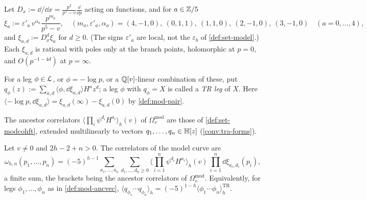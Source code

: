 \begin{defn}
\label{def:mod-xi}
Let $D_x:=\dd/\dd x=\frac{p^2}{p^5-v}\frac{\dd}{\dd p}$ acting on functions, and for $a\in\mathbb{Z}/5$
\[
\xi_a:=\varepsilon'_a\,v^{\alpha_a}\frac{p^{m_a}}{p^5-v},\quad (m_a,\varepsilon'_a,\alpha_a)=(4,-1,0),\ (0,1,1),\ (1,1,0),\ (2,-1,0),\ (3,-1,0)\quad(a=0,\dots,4),
\]
and $\xi_{a,d}:=D_x^d\xi_a$ for $d\geq 0$. (The signs $\varepsilon'_a$ are local, not the $\varepsilon_b$ of \cref{def:set-model}.) Each $\xi_{a,d}$ is rational with poles only at the branch points, holomorphic at $p=0$, and $O(p^{-1-4d})$ at $p=\infty$.
\end{defn}

\begin{defn}
\label{def:mod-ancvec}
For a leg $\phi\in\mathcal{L}$, or $\phi=-\log p$, or a $\mathbb{Q}[v]$-linear combination of these, put $q_\phi(z):=\sum_{a,d}\langle\phi,\dd\xi_{a,d}\rangle H^az^d$; a leg $\phi$ with $q_\phi=X$ is called a \emph{TR leg} of $X$. Here $\langle-\log p,\dd\xi_{a,d}\rangle=\xi_{a,d}(\infty)-\xi_{a,d}(0)$ by \cref{def:mod-pair}.
\end{defn}

The ancestor correlators $\langle\prod_i\psi^{d_i}H^{a_i}\rangle_h(v)$ of $\Omega^{\mathrm{mod}}_v$ are those of \cref{def:set-modcohft}, extended multilinearly to vectors $q_1,\dots,q_n\in\mathbb{H}[z]$ (\cref{conv:tra-forms}).

\begin{thm}
\label{thm:mod-tr}
Let $v\neq 0$ and $2h-2+n>0$. The correlators of the model curve are
\begin{equation}
\label{eq:mod-tr}
\omega_{h,n}(p_1,\dots,p_n)=(-5)^{h-1}\sum_{a_1,\dots,a_n}\sum_{d_1,\dots,d_n\geq 0}\Big\langle\prod_{i=1}^n\psi^{d_i}H^{a_i}\Big\rangle_h(v)\,\prod_{i=1}^n\dd\xi_{a_i,d_i}(p_i),
\end{equation}
a finite sum, the brackets being the ancestor correlators of $\Omega^{\mathrm{mod}}_v$. Equivalently, for legs $\phi_1,\dots,\phi_n$ as in \cref{def:mod-ancvec}, $\langle q_{\phi_1}\cdots q_{\phi_n}\rangle_h=(-5)^{1-h}\langle\phi_1\cdots\phi_n\rangle^{\mathrm{TR}}_h$.
\end{thm}


